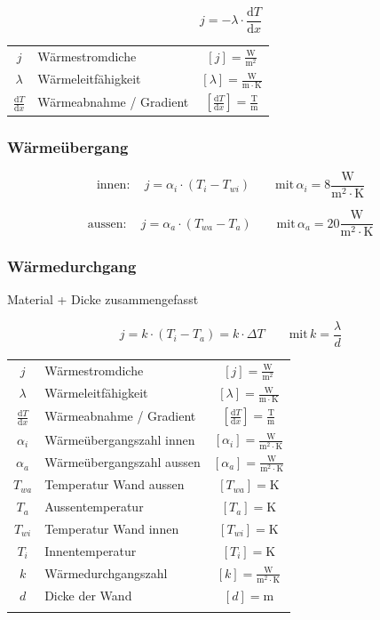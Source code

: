 $$ \boxed{ j = - \lambda \cdot \frac{\mathrm{d} T}{\mathrm{d} x}  } $$ 


\begin{tabular}{c l c}
	\rule{0pt}{10pt}$j$ & Wärmestromdiche & $[j] = \mathrm{\frac{W}{m^2}}$ \\
	\rule{0pt}{10pt}$\lambda$ & Wärmeleitfähigkeit & $[\lambda] = \mathrm{\frac{W}{m \cdot K}} $\\
	\rule{0pt}{10pt}$\frac{\mathrm{d} T}{\mathrm{d} x}$ & Wärmeabnahme / Gradient & $ [\frac{\mathrm{d} T}{\mathrm{d} x}] = \mathrm{\frac{T}{m}}$ \\
\end{tabular}


\subsubsection{Wärmeübergang}

$$ \boxed{\mathrm{innen:} \quad  j = \alpha_i \cdot (T_i - T_{wi} )  \qquad \mathrm{mit} \, \alpha_i = 8 \mathrm{\frac{W}{m^2 \cdot K}}  }  $$ 

$$ \boxed{\mathrm{aussen:} \quad  j = \alpha_a \cdot (T_{wa} - T_a )  \qquad \mathrm{mit} \, \alpha_a = 20 \mathrm{\frac{W}{m^2 \cdot K}}  }  $$ 





\subsubsection{Wärmedurchgang}
Material + Dicke zusammengefasst

$$ \boxed{ j = k \cdot (T_i - T_a) = k \cdot \Delta T  \qquad \mathrm{mit} \, k = \frac{\lambda}{d} }  $$ 



\begin{tabular}{c l c}
	\rule{0pt}{10pt}$j$ & Wärmestromdiche & $[j] = \mathrm{\frac{W}{m^2}}$ \\
	\rule{0pt}{10pt}$\lambda$ & Wärmeleitfähigkeit & $[\lambda] = \mathrm{\frac{W}{m \cdot K}} $\\
	\rule{0pt}{10pt}$\frac{\mathrm{d} T}{\mathrm{d} x}$ & Wärmeabnahme / Gradient & $ [\frac{\mathrm{d} T}{\mathrm{d} x}] = \mathrm{\frac{T}{m}}$ \\
	\rule{0pt}{10pt}$\alpha_i$ & Wärmeübergangszahl innen & $[\alpha_i] = \mathrm{\frac{W}{m^2 \cdot K}} $\\
	\rule{0pt}{10pt}$\alpha_a$ & Wärmeübergangszahl aussen & $[\alpha_a] = \mathrm{\frac{W}{m^2 \cdot K}} $\\
	$T_{wa}$ & Temperatur Wand aussen & $[T_{wa}] = \mathrm{K}$ \\
	$T_a$ & Aussentemperatur & $[T_a] = \mathrm{K}$ \\
	$T_{wi}$ & Temperatur Wand innen & $[T_{wi}] = \mathrm{K}$ \\
	$T_i$ & Innentemperatur & $[T_i] = \mathrm{K}$ \\
	\rule{0pt}{10pt}$k$ & Wärmedurchgangszahl & $[k] = \mathrm{\frac{W}{m^2 \cdot K}}$ \\
	$d$ & Dicke der Wand & $[d] = \mathrm{m}$ \\
	\\
\end{tabular}


